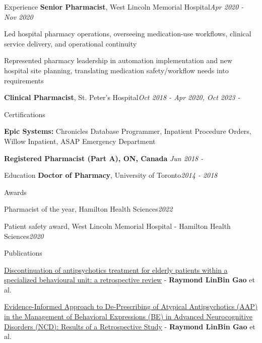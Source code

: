 \documentclass{resume}
\begin{document}
\begin{rSection}{Experience}
{\bf Senior Pharmacist}{, }{West Lincoln Memorial Hospital}\hfill {\em Apr 2020 - Nov 2020}
\item[$\bullet$] Led hospital pharmacy operations, overseeing medication-use workflows, clinical service delivery, and operational continuity
\item[$\bullet$] Represented pharmacy leadership in automation implementation and new hospital site planning, translating medication safety/workflow needs into requirements
\vspace{0.2em}

{\bf Clinical Pharmacist}{, }{St. Peter's Hospital}\hfill {\em Oct 2018 - Apr 2020, Oct 2023 - }

\end{rSection}

\begin{rSection}{Certifications}
\item {\bf Epic Systems:} Chronicles Database Programmer, Inpatient Procedure Orders, Willow Inpatient, ASAP Emergency Department
\item {\bf Registered Pharmacist (Part A), ON, Canada} \hfill {\em Jun 2018 - }
\end{rSection}

\begin{rSection}{Education}
{\bf Doctor of Pharmacy}{, }{University of Toronto}\hfill {\em 2014 - 2018} 
\end{rSection}

\begin{rSection}{Awards}
\item Pharmacist of the year, Hamilton Health Sciences\hfill{\em 2022}
\item Patient safety award, West Lincoln Memorial Hospital - Hamilton Health Sciences\hfill{\em 2020}
\end{rSection}

\begin{rSection}{Publications}
\item \href{https://link.springer.com/article/10.1007/s11096-020-01135-9}{Discontinuation of antipsychotics treatment for elderly patients within a specialized behavioural unit: a retrospective review} - {\bf Raymond LinBin Gao} et al.
\item \href{https://www.mdpi.com/2308-3417/7/1/14}{Evidence-Informed Approach to De-Prescribing of Atypical Antipsychotics (AAP) in the Management of Behavioral Expressions (BE) in Advanced Neurocognitive Disorders (NCD): Results of a Retrospective Study} - {\bf Raymond LinBin Gao} et al.
\end{rSection}
\end{document}
